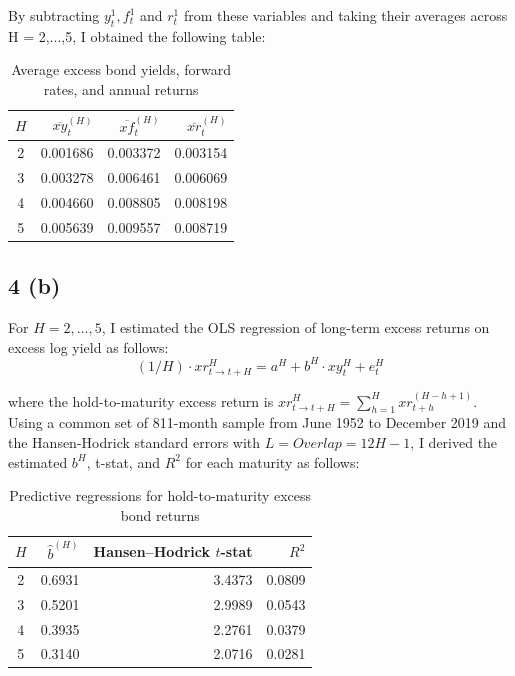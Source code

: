 \documentclass[11pt]{article}
\begin{document}
By subtracting $y_t^{1}, f_t^{1}$ and $r_t^{1}$ from these variables and taking their averages across H = 2,...,5, I obtained the following table: 

\begin{table}[H]
  \centering
  \caption{Average excess bond yields, forward rates, and annual returns}
  \label{tab:q4a}
  \begin{tabular}{crrr}
    \toprule
    $H$ & $\overline{xy}_{t}^{(H)}$ & $\overline{xf}_{t}^{(H)}$ & $\overline{xr}_{t}^{(H)}$ \\
    \midrule
    2 & 0.001686 & 0.003372 & 0.003154 \\
    3 & 0.003278 & 0.006461 & 0.006069 \\
    4 & 0.004660 & 0.008805 & 0.008198 \\
    5 & 0.005639 & 0.009557 & 0.008719 \\
    \bottomrule
  \end{tabular}
\end{table}

\subsection*{4 (b)} 
For $H = 2,\ldots,5$, I estimated the OLS regression of long-term excess returns on excess log yield as follows: 
\[
    (1/H) \cdot xr_{t \to t+H}^{H} = a^{H} + b^{H} \cdot xy_{t}^{H} + e_{t}^{H}
\]

where the hold-to-maturity excess return is $xr_{t \to t+H}^{H} = \sum_{h=1}^{H} xr_{t+h}^{(H-h+1)}$. Using a common set of 811-month sample from June 1952 to December 2019 and the Hansen-Hodrick standard errors with $L = Overlap = 12H-1$, I derived the estimated $b^{H}$, t-stat, and $R^2$ for each maturity as follows: 
\begin{table}[H]
  \centering
  \caption{Predictive regressions for hold-to-maturity excess bond returns}
  \label{tab:q4b}
  \begin{tabular}{crrr}
    \toprule
    $H$ & $\hat{b}^{(H)}$ & Hansen--Hodrick $t$-stat & $R^2$ \\
    \midrule
    2 & 0.6931 & 3.4373 & 0.0809 \\
    3 & 0.5201 & 2.9989 & 0.0543 \\
    4 & 0.3935 & 2.2761 & 0.0379 \\
    5 & 0.3140 & 2.0716 & 0.0281 \\
    \bottomrule
  \end{tabular}
\end{table} 
\end{document}
